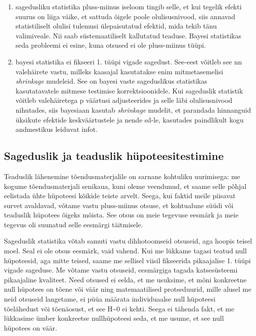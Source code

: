 \documentclass[]{book}
\begin{document}
\begin{enumerate}
\item
  sagedusliku statistika pluss-miinus iseloom tingib selle, et kui tegelik efekti suurus on liiga väike, et sattuda õigele poole olulisusnivood, siis annavad statistiliselt olulisi tulemusi ülepaisutatud efektid, mida tekib tänu valimiveale. Nii saab süstemaatiliselt kallutatud teaduse. Bayesi statistikas seda probleemi ei esine, kuna otsused ei ole pluss-miinus tüüpi.
\item
  bayesi statistika ei fikseeri 1. tüüpi vigade sagedust. See-eest võitleb see nn valehäirete vastu, milleks kaasajal kasutatakse enim mitmetasemelisi \emph{shrinkage} mudeleid. See on bayesi vaste sageduslikus statistikas kasutatavatele mitmese testimise korrektsioonidele. Kui sageduslik statistik võitleb valehäiretega p väärtusi adjusteerides ja selle läbi olulisusnivood nihutades, siis bayesiaan kasutab \emph{shrinkage} mudelit, et parandada hinnanguid üksikute efektide keskväärtustele ja nende sd-le, kasutades paindlikult kogu andmestikus leiduvat infot.
\end{enumerate}

\hypertarget{sageduslik-ja-teaduslik-hupoteesitestimine-1}{%
\subsection*{Sageduslik ja teaduslik hüpoteesitestimine}\label{sageduslik-ja-teaduslik-hupoteesitestimine-1}}

Teaduslik lähenemine tõendusmaterjalile on sarnane kohtuliku uurimisega: me kogume tõendusmaterjali senikaua, kuni oleme veendunud, et saame selle põhjal eelistada ühte hüpoteesi kõikide teiste arvelt. Seega, kui faktid meile piisavat survet avaldavad, võtame vastu pluss-miinus otsuse, et kohtualune süüdi või teaduslik hüpotees õigeks mõista. See otsus on meie tegevuse eesmärk ja meie tegevus oli suunatud selle eesmärgi täitmisele.

Sageduslik statistika võtab samuti vastu dihhotoomseid otsuseid, aga hoopis teisel moel. Seal ei ole otsus eesmärk, vaid vahend. Kui me lükkame tagasi teatud null hüpoteesid, aga mitte teised, saame me sellisel viisil fikseerida pikaajalise 1. tüüpi vigade sageduse. Me võtame vastu otsuseid, eesmärgiga tagada katsesüsteemi pikaajaline kvaliteet. Need otsused ei eelda, et me usuksime, et mõni konkreetne null hüpotees on tõene või väär ning matemaatilised protseduurid, mille alusel me neid otsuseid langetame, ei püüa määrata individuaalse null hüpoteesi tõelähedust või tõenäosust, et see H\textasciitilde{}0 ei kehti. Seega ei tähenda fakt, et me lükkasime ümber konkreetse nullhüpoteesi seda, et me usume, et see null hüpotees on väär.
\end{document}
